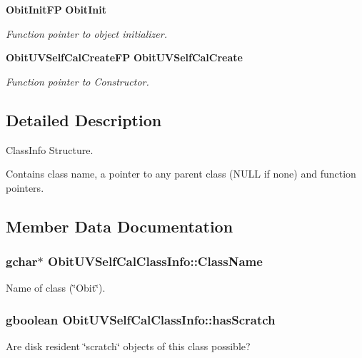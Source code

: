 \begin{CompactItemize}
{\bf Obit\-Init\-FP} {\bf Obit\-Init}
\begin{CompactList}\small\item\em Function pointer to object initializer. \item\end{CompactList}\item 
{\bf Obit\-UVSelf\-Cal\-Create\-FP} {\bf Obit\-UVSelf\-Cal\-Create}
\begin{CompactList}\small\item\em Function pointer to Constructor. \item\end{CompactList}\end{CompactItemize}


\subsection{Detailed Description}
Class\-Info Structure. 

Contains class name, a pointer to any parent class (NULL if none) and function pointers. 



\subsection{Member Data Documentation}
\subsubsection{\setlength{\rightskip}{0pt plus 5cm}gchar$\ast$ {\bf Obit\-UVSelf\-Cal\-Class\-Info::Class\-Name}}\label{structObitUVSelfCalClassInfo_o2}


Name of class (\char`\"{}Obit\char`\"{}). 

\subsubsection{\setlength{\rightskip}{0pt plus 5cm}gboolean {\bf Obit\-UVSelf\-Cal\-Class\-Info::has\-Scratch}}\label{structObitUVSelfCalClassInfo_o1}


Are disk resident \char`\"{}scratch\char`\"{} objects of this class possible? 

